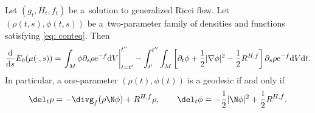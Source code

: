 \begin{Lemma}\label{lemma: el} Let $(g_t,H_t, f_t)$ be a~solution to generalized Ricci flow. Let
$(\rho(t,s), \phi(t,s))$ be a~two-parameter family of densities and functions satisfying \eqref{eq: conteq}. Then
	\begin{align*}
	\frac{{\rm d}}{{\rm d}s}E_0(\mu(\cdot,s))=\left.\int_M\phi\partial_s\rho {\rm e}^{-f} {\rm d}V\right|_{t=t'}^{t''}
	-\int_{t'}^{t''}\int_M\left[\partial_t\phi+\frac12|\nabla\phi|^2 -\frac12 R^{H,f}\right] \partial_s\rho {\rm e}^{-f} {\rm d}V{\rm d}t.
	\end{align*}
 In particular, a one-parameter $(\rho(t), \phi(t))$ is a geodesic if and only if
\begin{equation}\label{eq: geodesic}
\del_t \rho=-\divg_f(\rho\N\phi)+R^{H,f}\rho,\qquad
\del_t\phi=-\frac12|\N\phi|^2+\frac12 R^{H,f}.
\end{equation}
\end{Lemma}

